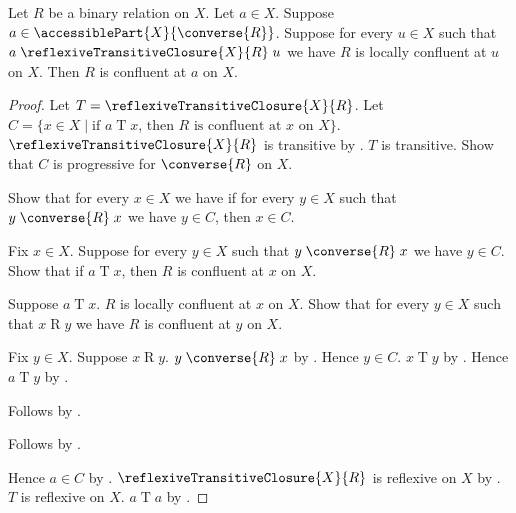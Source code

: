\begin{theorem}\label{accessible_descendant_local_confluence_implies_confluent_at}
    Let $R$ be a binary relation on $X$.
    Let $a\in X$.
    Suppose $a\in\accessiblePart{X}{\converse{R}}$.
    Suppose for every $u\in X$ such that
        $a\mathrel{\reflexiveTransitiveClosure{X}{R}}u$
        we have $R$ is locally confluent at $u$ on $X$.
    Then $R$ is confluent at $a$ on $X$.
\end{theorem}
\begin{proof}
    Let $T=\reflexiveTransitiveClosure{X}{R}$.
    Let $C=\{x\in X\mid\text{if $a\mathrel{T}x$, then
        $R$ is confluent at $x$ on $X$}\}$.
    $\reflexiveTransitiveClosure{X}{R}$ is transitive
        by .
    $T$ is transitive.
    Show that $C$ is progressive for $\converse{R}$ on $X$.
    \begin{subproof}
        Show that for every $x\in X$ we have if for every $y\in X$ such that
            $y\mathrel{\converse{R}}x$ we have $y\in C$, then $x\in C$.
        \begin{subproof}
            Fix $x\in X$.
            Suppose for every $y\in X$ such that
                $y\mathrel{\converse{R}}x$ we have $y\in C$.
            Show that if $a\mathrel{T}x$, then
                $R$ is confluent at $x$ on $X$.
            \begin{subproof}
                Suppose $a\mathrel{T}x$.
                $R$ is locally confluent at $x$ on $X$.
                Show that for every $y\in X$ such that $x\mathrel{R}y$
                    we have $R$ is confluent at $y$ on $X$.
                \begin{subproof}
                    Fix $y\in X$.
                    Suppose $x\mathrel{R}y$.
                    $y\mathrel{\converse{R}}x$ by .
                    Hence $y\in C$.
                    $x\mathrel{T}y$
                        by .
                    Hence $a\mathrel{T}y$ by .
                \end{subproof}
                Follows by .
            \end{subproof}
        \end{subproof}
        Follows by .
    \end{subproof}
    Hence $a\in C$ by .
    $\reflexiveTransitiveClosure{X}{R}$ is reflexive on $X$
        by .
    $T$ is reflexive on $X$.
    $a\mathrel{T}a$ by .
\end{proof}

